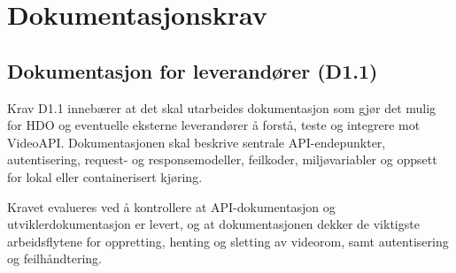 \section{Dokumentasjonskrav}
\label{sec:krav-dokumentasjon}

\subsection{Dokumentasjon for leverandører (D1.1)}
\label{subsec:krav-d11}

Krav D1.1 innebærer at det skal utarbeides dokumentasjon som gjør det 
mulig for HDO og eventuelle eksterne leverandører å forstå, teste og 
integrere mot VideoAPI. Dokumentasjonen skal beskrive sentrale 
API-endepunkter, autentisering, request- og responsemodeller, feilkoder, 
miljøvariabler og oppsett for lokal eller containerisert kjøring.

Kravet evalueres ved å kontrollere at API-dokumentasjon og 
utviklerdokumentasjon er levert, og at dokumentasjonen dekker de viktigste 
arbeidsflytene for oppretting, henting og sletting av videorom, samt 
autentisering og feilhåndtering.
